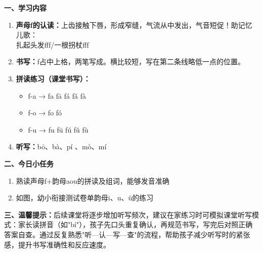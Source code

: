 \documentclass[a4paper, 14pt]{article}
\begin{document}

\begin{pinyinbox}
\par
\textbf{一、学习内容}

\begin{enumerate}
\item \textbf{声母f的认读：}上齿接触下唇，形成窄缝，气流从中发出，气音短促！助记忆儿歌：\\
扎起头发fff/一根拐杖fff

\item \textbf{书写：}f占中上格，两笔写成。横比较短，写在第二条线略低一点的位置。

\item \textbf{拼读练习（课堂书写）：}
\begin{itemize}
\item f-a → fa fā fá fǎ fà
\item f-o → fo fó
\item f-u → fu fū fú fǔ fù
\end{itemize}

\item \textbf{听写：}bō、bà、pí 、mò、mí
\end{enumerate}

\textbf{二、今日小任务}

\begin{enumerate}
\item 熟读声母f+韵母aou的拼读及组词，能够发音准确
\item 如图，幼小衔接测试卷单韵母i、u、ü的练习
\end{enumerate}

\textbf{三、温馨提示：}后续课堂将逐步增加听写频次，建议在家练习时可模拟课堂听写模式：家长读拼音（如"bí"），孩子先口头重复确认，再规范书写，写完后对照正确答案自查。通过反复熟悉"听—认—写—查"的流程，帮助孩子减少听写时的紧张感，提升书写准确性和反应速度。

\end{pinyinbox}

\end{document}

